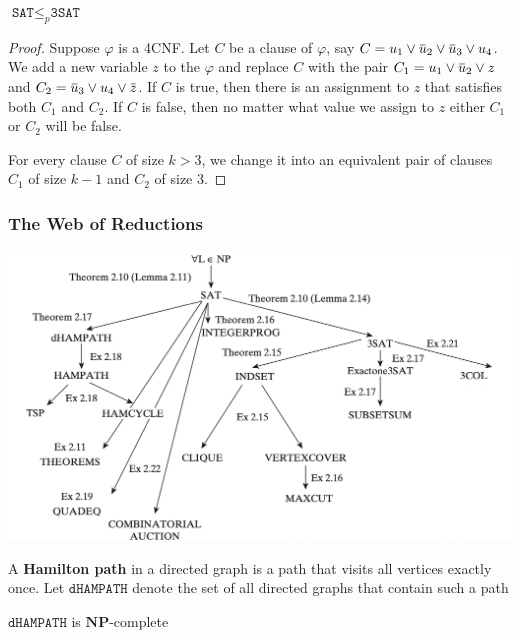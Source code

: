 \documentclass[11pt]{article}
\def \NP {\textbf{NP}}
\def \NP {\textbf{NP}}
\def \SAT {\texttt{SAT}}
\def \TSAT {\texttt{3SAT}}
\def \dHAMPATH {\texttt{dHAMPATH}}
\begin{document}
\begin{lemma}[]
\(\SAT\le_p\TSAT\)
\end{lemma}

\begin{proof}
Suppose \(\varphi\) is a 4CNF. Let \(C\) be a clause of \(\varphi\), say \(C=u_1\vee\baru_2\vee\baru_3\vee u_4\).
We add a new variable \(z\) to the \(\varphi\) and replace \(C\) with the pair
\(C_1=u_1\vee\baru_2\vee z\) and \(C_2=\baru_3\vee u_4\vee\barz\). If \(C\) is true, then there
is an assignment to \(z\) that satisfies both \(C_1\) and \(C_2\). If \(C\) is false, then no
matter what value we assign to \(z\) either \(C_1\) or \(C_2\) will be false.

For every clause \(C\) of size \(k>3\), we change it into an equivalent pair of clauses \(C_1\)
of size \(k-1\) and \(C_2\) of size 3.
\end{proof}


\subsubsection{The Web of Reductions}
\label{sec:orgd192646}
\begin{center}
\includegraphics[width=.8\textwidth]{./3.png}
\end{center}

A \textbf{Hamilton path} in a directed graph is a path that visits all vertices exactly once. Let
\(\dHAMPATH\) denote the set of all directed graphs that contain such a path
\begin{theorem}[]
\(\dHAMPATH\) is \(\NP\)-complete
\end{theorem}
\end{document}
